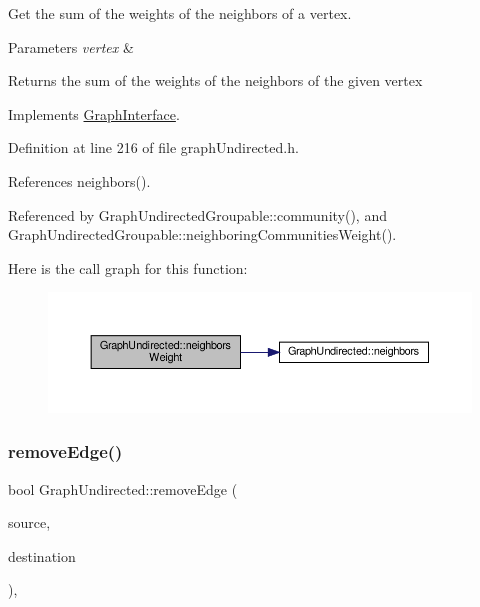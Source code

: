 Get the sum of the weights of the neighbors of a vertex. 


\begin{DoxyParams}{Parameters}
{\em vertex} & \\
\hline
\end{DoxyParams}
\begin{DoxyReturn}{Returns}
the sum of the weights of the neighbors of the given vertex 
\end{DoxyReturn}


Implements \hyperlink{classGraphInterface_a77b93eb2da955cb41b389df023676c1b}{Graph\+Interface}.



Definition at line 216 of file graph\+Undirected.\+h.



References neighbors().



Referenced by Graph\+Undirected\+Groupable\+::community(), and Graph\+Undirected\+Groupable\+::neighboring\+Communities\+Weight().

Here is the call graph for this function\+:
\nopagebreak
\begin{figure}[H]
\begin{center}
\leavevmode
\includegraphics[width=350pt]{classGraphUndirected_a5bc804358a7bc0087953023c597a621b_cgraph}
\end{center}
\end{figure}
\mbox{\label{classGraphUndirected_af4a40541132a66c9b688a20958057751}} 
\subsubsection{\texorpdfstring{remove\+Edge()}{removeEdge()}\hspace{0.1cm}{\footnotesize\ttfamily [1/2]}}
{\footnotesize\ttfamily bool Graph\+Undirected\+::remove\+Edge (\begin{DoxyParamCaption}\item[{const \hyperlink{edge_8h_a5fbd20c46956d479cb10afc9855223f6}{type\+Vertex} \&}]{source,  }\item[{const \hyperlink{edge_8h_a5fbd20c46956d479cb10afc9855223f6}{type\+Vertex} \&}]{destination }\end{DoxyParamCaption})\hspace{0.3cm}{\ttfamily [inline]}, {\ttfamily [virtual]}}

